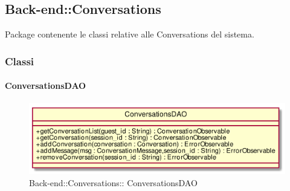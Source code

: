\subsection{Back-end::Conversations}
Package contenente le classi relative alle Conversations del sistema.
\subsubsection{Classi}
\hypertarget{ ConversationsDAO_label}{\paragraph{ ConversationsDAO}}
\begin{figure}[h]
	\centering
	\includegraphics[width=\textwidth,height=\textheight,keepaspectratio]{images/Class_ConversationsDAO.png}
	\caption{Back-end::Conversations:: ConversationsDAO}
\end{figure}
